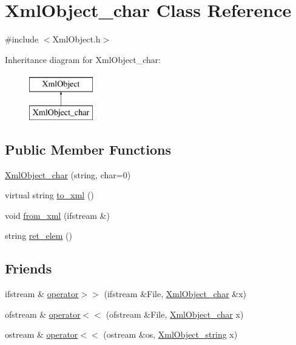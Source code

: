 \hypertarget{classXmlObject__char}{\section{Xml\-Object\-\_\-char Class Reference}
\label{classXmlObject__char}
}


{\ttfamily \#include $<$Xml\-Object.\-h$>$}

Inheritance diagram for Xml\-Object\-\_\-char\-:\begin{figure}[H]
\begin{center}
\leavevmode
\includegraphics[height=2.000000cm]{classXmlObject__char}
\end{center}
\end{figure}
\subsection*{Public Member Functions}
\begin{DoxyCompactItemize}
\item 
\hyperlink{classXmlObject__char_a593b9a08b971c8b219ffc3a65d224d8d}{Xml\-Object\-\_\-char} (string, char=0)
\item 
virtual string \hyperlink{classXmlObject__char_a7caa4d2b62ce3240cb6721ca9ac1150d}{to\-\_\-xml} ()
\item 
void \hyperlink{classXmlObject__char_a06b20ae9d07bd741de017a08895d0da8}{from\-\_\-xml} (ifstream \&)
\item 
string \hyperlink{classXmlObject__char_a45df01ffd190f0e33f673f2082b0ff8a}{ret\-\_\-elem} ()
\end{DoxyCompactItemize}
\subsection*{Friends}
\begin{DoxyCompactItemize}
\item 
ifstream \& \hyperlink{classXmlObject__char_a5559be49bfe5a30e2e39e19aacf4016d}{operator$>$$>$} (ifstream \&File, \hyperlink{classXmlObject__char}{Xml\-Object\-\_\-char} \&x)
\item 
ofstream \& \hyperlink{classXmlObject__char_a573187365149e426097b27ebbf8e9da3}{operator$<$$<$} (ofstream \&File, \hyperlink{classXmlObject__char}{Xml\-Object\-\_\-char} x)
\item 
ostream \& \hyperlink{classXmlObject__char_a47a42d8624b5b6ce6252d2cf6a815b8a}{operator$<$$<$} (ostream \&os, \hyperlink{classXmlObject__string}{Xml\-Object\-\_\-string} x)
\end{DoxyCompactItemize}
